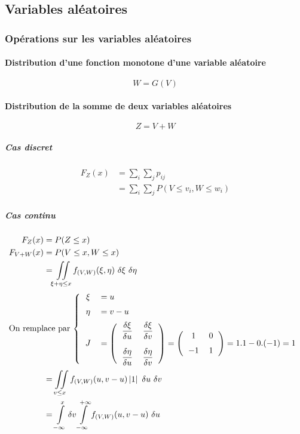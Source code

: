 \subsection{Variables aléatoires}



\subsubsection{Opérations sur les variables aléatoires}



\paragraph{Distribution d'une fonction monotone d'une variable aléatoire}
$$\boxed{W = G(V)}$$



\paragraph{Distribution de la somme de deux variables aléatoires}
$$\boxed{Z = V+W}$$



\subparagraph{Cas discret}
\begin{align*}
    F_Z(x) &= \sum_i\sum_jp_{ij}\\
           &= \sum_i\sum_jP(V \leq v_i,W \leq w_i)
\end{align*}



\subparagraph{Cas continu}
\begin{align*}
    F_Z(x)     &= P(Z \leq x)\\
    F_{V+W}(x) &= P(V \leq x, W \leq x) \\
	           &= \iint\limits_{\xi + \eta\leq x} f_{(V,W)}(\xi,\eta)\ \delta\xi\ \delta\eta\\
\intertext{On remplace par $\left\{
\begin{tabular}{cl}
	$\xi$  & $= u$\\[0.2cm]
	$\eta$ & $= v-u$\\[0.2cm]
	$J$    & $= \left(\begin{tabular}{cc}$\dfrac{\delta\xi}{\delta u}$&$\dfrac{\delta \xi}{\delta v}$\\[0.5cm]$\dfrac{\delta\eta}{\delta u}$&$\dfrac{\delta\eta}{\delta v}$\end{tabular}\right) = \left(\begin{tabular}{cc}1&0\\[0.2cm]$-1$&$1$\end{tabular}\right) = 1.1-0.(-1) = 1$
\end{tabular}
\right.$}
	           &= \iint\limits_{v\leq x} f_{(V,W)}(u,v-u)\left|1\right|\ \delta u\ \delta v\\
               &= \int\limits_{-\infty}^x\delta v \int\limits_{-\infty}^{+\infty} f_{(V,W)}(u,v-u)\ \delta u
\end{align*}

